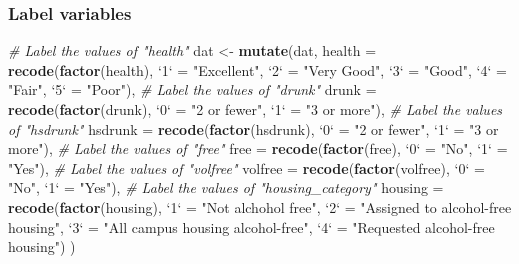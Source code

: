 \documentclass[]{article}
\newenvironment{Shaded}{\begin{snugshade}}{\end{snugshade}}
\newcommand{\CommentTok}[1]{\textcolor[rgb]{0.56,0.35,0.01}{\textit{#1}}}
\newcommand{\DataTypeTok}[1]{\textcolor[rgb]{0.13,0.29,0.53}{#1}}
\newcommand{\KeywordTok}[1]{\textcolor[rgb]{0.13,0.29,0.53}{\textbf{#1}}}
\newcommand{\NormalTok}[1]{#1}
\newcommand{\StringTok}[1]{\textcolor[rgb]{0.31,0.60,0.02}{#1}}
\begin{document}
\hypertarget{label-variables}{%
\subsubsection{Label variables}\label{label-variables}}

\begin{Shaded}
\begin{Highlighting}[]
\CommentTok{# Label the values of "health"}
\NormalTok{dat <-}\StringTok{ }\KeywordTok{mutate}\NormalTok{(dat, }\DataTypeTok{health =} \KeywordTok{recode}\NormalTok{(}\KeywordTok{factor}\NormalTok{(health),}
      \StringTok{`}\DataTypeTok{1}\StringTok{`}\NormalTok{ =}\StringTok{ "Excellent"}\NormalTok{, }\StringTok{`}\DataTypeTok{2}\StringTok{`}\NormalTok{ =}\StringTok{ "Very Good"}\NormalTok{, }\StringTok{`}\DataTypeTok{3}\StringTok{`}\NormalTok{ =}\StringTok{ "Good"}\NormalTok{, }\StringTok{`}\DataTypeTok{4}\StringTok{`}\NormalTok{ =}\StringTok{ "Fair"}\NormalTok{, }
      \StringTok{`}\DataTypeTok{5}\StringTok{`}\NormalTok{ =}\StringTok{ "Poor"}\NormalTok{), }
      \CommentTok{# Label the values of "drunk"}
      \DataTypeTok{drunk =} \KeywordTok{recode}\NormalTok{(}\KeywordTok{factor}\NormalTok{(drunk), }\StringTok{`}\DataTypeTok{0}\StringTok{`}\NormalTok{ =}\StringTok{ "2 or fewer"}\NormalTok{, }\StringTok{`}\DataTypeTok{1}\StringTok{`}\NormalTok{ =}\StringTok{ "3 or more"}\NormalTok{),}
      \CommentTok{# Label the values of "hsdrunk"}
      \DataTypeTok{hsdrunk =} \KeywordTok{recode}\NormalTok{(}\KeywordTok{factor}\NormalTok{(hsdrunk), }\StringTok{`}\DataTypeTok{0}\StringTok{`}\NormalTok{ =}\StringTok{ "2 or fewer"}\NormalTok{, }\StringTok{`}\DataTypeTok{1}\StringTok{`}\NormalTok{ =}\StringTok{ "3 or more"}\NormalTok{),}
      \CommentTok{# Label the values of "free"}
      \DataTypeTok{free =} \KeywordTok{recode}\NormalTok{(}\KeywordTok{factor}\NormalTok{(free), }\StringTok{`}\DataTypeTok{0}\StringTok{`}\NormalTok{ =}\StringTok{ "No"}\NormalTok{, }\StringTok{`}\DataTypeTok{1}\StringTok{`}\NormalTok{ =}\StringTok{ "Yes"}\NormalTok{),}
      \CommentTok{# Label the values of "volfree"}
      \DataTypeTok{volfree =} \KeywordTok{recode}\NormalTok{(}\KeywordTok{factor}\NormalTok{(volfree), }\StringTok{`}\DataTypeTok{0}\StringTok{`}\NormalTok{ =}\StringTok{ "No"}\NormalTok{, }\StringTok{`}\DataTypeTok{1}\StringTok{`}\NormalTok{ =}\StringTok{ "Yes"}\NormalTok{),}
      \CommentTok{# Label the values of "housing_category"}
      \DataTypeTok{housing =} \KeywordTok{recode}\NormalTok{(}\KeywordTok{factor}\NormalTok{(housing), }\StringTok{`}\DataTypeTok{1}\StringTok{`}\NormalTok{ =}\StringTok{ "Not alchohol free"}\NormalTok{,}
              \StringTok{`}\DataTypeTok{2}\StringTok{`}\NormalTok{ =}\StringTok{ "Assigned to alcohol-free housing"}\NormalTok{, }
              \StringTok{`}\DataTypeTok{3}\StringTok{`}\NormalTok{ =}\StringTok{ "All campus housing alcohol-free"}\NormalTok{, }
              \StringTok{`}\DataTypeTok{4}\StringTok{`}\NormalTok{ =}\StringTok{ "Requested alcohol-free housing"}\NormalTok{)}
\NormalTok{      )}



\end{Highlighting}
\end{Shaded}
\end{document}
